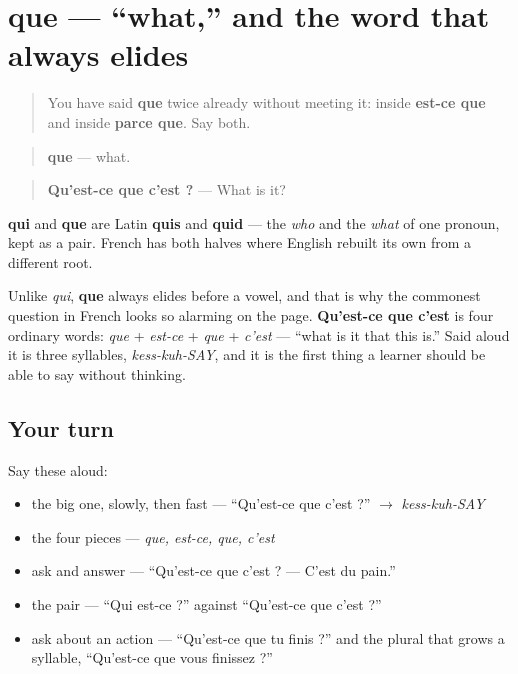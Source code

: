 \section[que]{que — \textquotedblleft{}what,\textquotedblright{} and the word that always elides}

\label{lesson:FR-C39-que}



\begin{quote}
You have said \textbf{que} twice already without meeting it: inside \textbf{est-ce que} and inside \textbf{parce que}. Say both.
\end{quote}

\begin{cousinweb}
\begin{quote}
\textbf{que} — what.
\end{quote}

\begin{quote}
\textbf{Qu'est-ce que c'est ?} — What is it?
\end{quote}

\textbf{qui} and \textbf{que} are Latin \textbf{quis} and \textbf{quid} — the \emph{who} and the \emph{what} of one pronoun, kept as a pair. French has both halves where English rebuilt its own from a different root.

Unlike \emph{qui}, \textbf{que} always elides before a vowel, and that is why the commonest question in French looks so alarming on the page. \textbf{Qu'est-ce que c'est} is four ordinary words: \emph{que} + \emph{est-ce} + \emph{que} + \emph{c'est} — \textquotedblleft{}what is it that this is.\textquotedblright{} Said aloud it is three syllables, \emph{kess-kuh-SAY}, and it is the first thing a learner should be able to say without thinking.
\end{cousinweb}

\subsection*{Your turn}
Say these aloud:

\begin{itemize}
\raggedright
  \item the big one, slowly, then fast — \textquotedblleft{}Qu'est-ce que c'est ?\textquotedblright{} $\to$ \emph{kess-kuh-SAY}
  \item the four pieces — \emph{que, est-ce, que, c'est}
  \item ask and answer — \textquotedblleft{}Qu'est-ce que c'est ? — C'est du pain.\textquotedblright{}
  \item the pair — \textquotedblleft{}Qui est-ce ?\textquotedblright{} against \textquotedblleft{}Qu'est-ce que c'est ?\textquotedblright{}
  \item ask about an action — \textquotedblleft{}Qu'est-ce que tu finis ?\textquotedblright{} and the plural that grows a syllable, \textquotedblleft{}Qu'est-ce que vous finissez ?\textquotedblright{}
\end{itemize}

